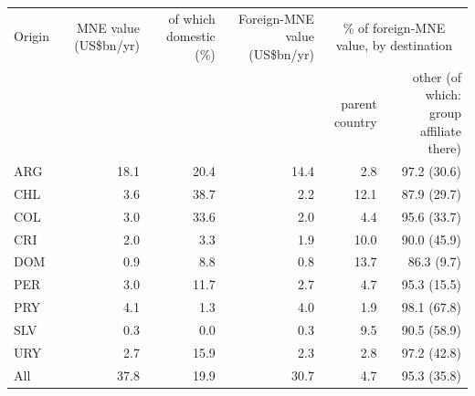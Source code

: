 \begin{tabular}{lrrrrr}
\toprule
Origin & MNE value (US\$bn/yr) & of which domestic (\%) & Foreign-MNE value (US\$bn/yr) & \multicolumn{2}{c}{\% of foreign-MNE value, by destination} \\
 & & & & parent country & other (of which: group affiliate there) \\
\midrule
ARG & 18.1 & 20.4 & 14.4 & 2.8 & 97.2 (30.6) \\
CHL & 3.6 & 38.7 & 2.2 & 12.1 & 87.9 (29.7) \\
COL & 3.0 & 33.6 & 2.0 & 4.4 & 95.6 (33.7) \\
CRI & 2.0 & 3.3 & 1.9 & 10.0 & 90.0 (45.9) \\
DOM & 0.9 & 8.8 & 0.8 & 13.7 & 86.3 (9.7) \\
PER & 3.0 & 11.7 & 2.7 & 4.7 & 95.3 (15.5) \\
PRY & 4.1 & 1.3 & 4.0 & 1.9 & 98.1 (67.8) \\
SLV & 0.3 & 0.0 & 0.3 & 9.5 & 90.5 (58.9) \\
URY & 2.7 & 15.9 & 2.3 & 2.8 & 97.2 (42.8) \\
\midrule
All & 37.8 & 19.9 & 30.7 & 4.7 & 95.3 (35.8) \\
\bottomrule
\end{tabular}
